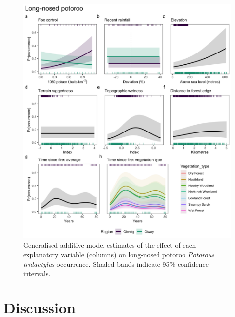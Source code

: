 \documentclass[11pt,a4paper,titlepage,twoside,openright]{style/unimelbthesis}
\begin{document}
\begin{mainmatter}
\begin{figure}
{\centering \includegraphics[width=1\linewidth]{figure/gams_lnp} 

}

\caption{Generalised additive model estimates of the effect of each explanatory variable (columns) on long-nosed potoroo \textit{Potorous tridactylus} occurrence. Shaded bands indicate 95\% confidence intervals.}\label{fig:gams-occ-lnp}
\end{figure}
\newpage

\hypertarget{discussion-1}{%
\section{Discussion}\label{discussion-1}}


\end{mainmatter}
\end{document}
